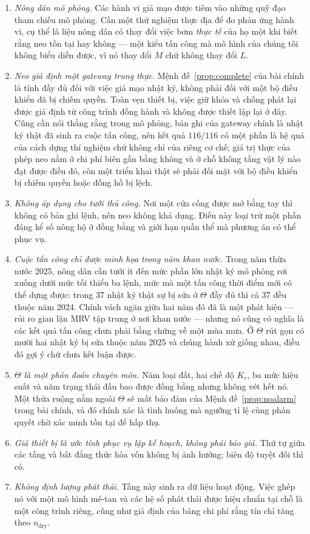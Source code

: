 \begin{enumerate}
\item \emph{Nông dân mô phỏng.} Các hành vi giả mạo được tiêm vào những quỹ đạo tham chiếu mô
phỏng. Cần một thử nghiệm thực địa để đo phản ứng hành vi, cụ thể là liệu nông dân có thay
đổi việc bơm \emph{thực tế} của họ một khi biết rằng neo tồn tại hay không --- một kiểu tấn
công mà mô hình của chúng tôi không biểu diễn được, vì nó thay đổi $M$ chứ không thay đổi $L$.
\item \emph{Neo giả định một gateway trung thực.} Mệnh đề~\ref{prop:complete} của bài chính là
tính đầy đủ đối với việc giả mạo nhật ký, không phải đối với một bộ điều khiển đã bị chiếm
quyền. Toàn vẹn thiết bị, việc giữ khóa và chống phát lại được giả định từ công trình đồng
hành và không được thiết lập lại ở đây. Cũng cần nói thẳng rằng trong mô phỏng, bản ghi của
gateway chính là nhật ký thật đã sinh ra cuộc tấn công, nên kết quả $116/116$ có một phần là
hệ quả của cách dựng thí nghiệm chứ không chỉ của riêng cơ chế; giá trị thực của phép neo nằm
ở chi phí biên gần bằng không và ở chỗ không tầng vật lý nào đạt được điều đó, còn một triển
khai thật sẽ phải đối mặt với bộ điều khiển bị chiếm quyền hoặc đồng hồ bị lệch.
\item \emph{Không áp dụng cho tưới thủ công.} Nơi một cửa cống được mở bằng tay thì không có
bản ghi lệnh, nên neo không khả dụng. Điều này loại trừ một phần đáng kể số nông hộ ở đồng
bằng và giới hạn quần thể mà phương án có thể phục vụ.
\item \emph{Cuộc tấn công chỉ được minh họa trong năm khan nước.} Trong năm thừa nước 2025,
nông dân cần tưới ít đến mức phần lớn nhật ký mô phỏng rơi xuống dưới mức tối thiểu ba lệnh,
mức mà một tấn công thời điểm mới có thể dựng được: trong $37$ nhật ký thật sự bị sửa ở
$\Theta$ đầy đủ thì cả $37$ đều thuộc năm 2024. Chính vách ngăn giữa hai năm đó đã là một
phát hiện --- rủi ro gian lận MRV tập trung ở nơi khan nước --- nhưng nó cũng có nghĩa là các
kết quả tấn công chưa phải bằng chứng về một mùa mưa. Ở $\Theta$ rút gọn có mười hai nhật ký
bị sửa thuộc năm 2025 và chúng hành xử giống nhau, điều đó gợi ý chứ chưa kết luận được.
\item \emph{$\Theta$ là một phán đoán chuyên môn.} Năm loại đất, hai chế độ $K_c$, ba mức hiệu
suất và năm trạng thái đầu bao được đồng bằng nhưng không vét hết nó. Một thửa ruộng nằm ngoài
$\Theta$ sẽ mất bảo đảm của Mệnh đề~\ref{prop:noalarm} trong bài chính, và đó chính xác là
tình huống mà ngưỡng tỉ lệ cùng phán quyết chờ xác minh tồn tại để hấp thụ.
\item \emph{Giá thiết bị là ước tính phục vụ lập kế hoạch, không phải báo giá.} Thứ tự giữa các
tầng và bất đẳng thức hòa vốn không bị ảnh hưởng; biên độ tuyệt đối thì có.
\item \emph{Không định lượng phát thải.} Tầng này sinh ra dữ liệu hoạt động. Việc ghép nó với
một mô hình mê-tan và các hệ số phát thải được hiệu chuẩn tại chỗ là một công trình riêng,
cũng như giả định của bảng chi phí rằng tín chỉ tăng theo $n_{\mathrm{dry}}$.
\end{enumerate}
